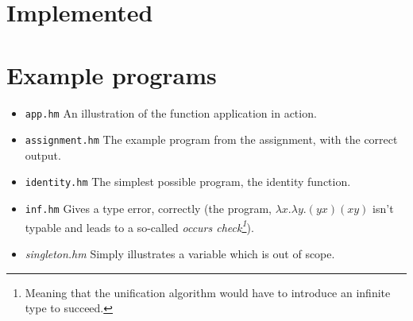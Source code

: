 \documentclass[a4paper]{article}
\begin{document}
\section{Implemented}

\section{Example programs}

\begin{itemize}
    \item \texttt{app.hm} An illustration of the function application in action. 
    \item \texttt{assignment.hm} The example program from the assignment, with
        the correct output. 
    \item \texttt{identity.hm} The simplest possible program, the identity
        function. 
    \item \texttt{inf.hm} Gives a type error, correctly (the program, $\lambda
        x.
        \lambda y . (y x) (x y)$ isn't typable and leads to a so-called
        \emph{occurs check\footnote{Meaning that the unification algorithm would
        have to introduce an infinite type to succeed.}}).
    \item \textit{singleton.hm} Simply illustrates a variable which is out of
        scope. 
\end{itemize}
\end{document}
